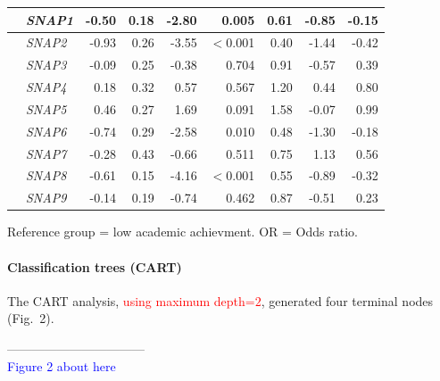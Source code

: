 \documentclass[10pt,letterpaper]{article}
\begin{document}
{{\begin{table}[H]
\begin{tabular}{|llrrrr|rrr|}
 \hline
  &  {\it SNAP1} & -0.50 & 0.18 & -2.80 & 0.005 & 0.61 &  -0.85 & -0.15  \\ 
  \hline
  &  {\it SNAP2} & -0.93 & 0.26 & -3.55 & $<$0.001 & 0.40 &  -1.44 & -0.42  \\ 
  \hline
  &  {\it SNAP3} & -0.09 & 0.25 & -0.38 & 0.704 & 0.91 &  -0.57 & 0.39  \\ 
  \hline
  &  {\it SNAP4} & 0.18 & 0.32 & 0.57& 0.567 & 1.20 &  0.44 & 0.80 \\ 
  \hline
  &  {\it SNAP5} & 0.46 & 0.27 & 1.69 & 0.091 & 1.58 &  -0.07 & 0.99  \\ 
  \hline 
  &  {\it SNAP6} & -0.74 & 0.29 & -2.58 & 0.010 & 0.48 &  -1.30 & -0.18  \\ 
   \hline
  &  {\it SNAP7} & -0.28 & 0.43 & -0.66 & 0.511 & 0.75 &   1.13 & 0.56  \\ 
  \hline
  &  {\it SNAP8} & -0.61 & 0.15 & -4.16 & $<$0.001 & 0.55 &  -0.89 & -0.32  \\ 
  \hline
  &  {\it SNAP9} & -0.14 & 0.19 & -0.74 & 0.462 & 0.87 &  -0.51 & 0.23  \\ 
   \hline

\end{tabular}
\begin{center}
Reference group = low academic achievment. OR = Odds ratio.\\ 
\end{center}
\end{table}
\vspace{5mm}


\paragraph{Classification trees (CART)}

 The CART analysis, \textcolor{red}{using  maximum depth=$2$},  generated four terminal nodes (Fig.~2). 
 
\vspace{3mm}
 
\begin{center}
---------------------------------\\
 
\textcolor{blue}{Figure 2 about here} \\
 

\end{center}}}
\end{document}
